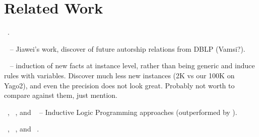 \section{Related Work}
\amie~\cite{galarraga2015fast}.

~\cite{zhu2011mining} -- Jiawei's work, discover of future autorship relations from DBLP (Vamsi?).

~\cite{abedjan2014amending} -- induction of new facts at instance level, rather than being generic and induce rules with variables. Discover much less new instances (2K vs our 100K on Yago2), and even the precision does not look great. Probably not worth to compare against them, just mention.

~\cite{muggleton1995inverse}, ~\cite{dehaspe1999discovery}, and ~\cite{schoenmackers2010learning} -- Inductive Logic Programming approaches (outperformed by \amie).

\yago~\cite{suchanek2007yago}, \dbpedia~\cite{bizer2009dbpedia}, and \wikidata~\cite{vrandevcic2014wikidata}.